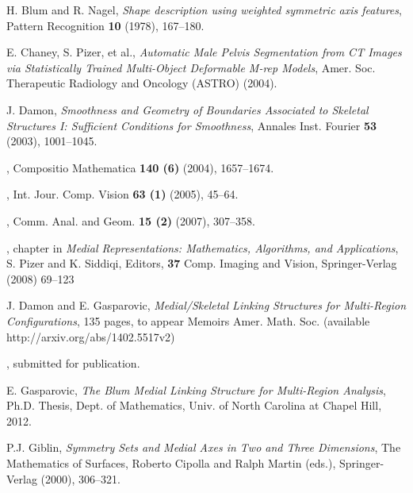 \documentclass[10pt]{amsart}
\theoremstyle{definition}
\theoremstyle{definition}
\numberwithin{equation}{section}
\begin{document}
\begin{thebibliography}{1}


  H. Blum and R. Nagel,  {\em Shape description using 
weighted symmetric axis features},  Pattern Recognition {\bf 10} (1978), 
167--180. 

 E. Chaney, S. Pizer, et al.,  {\em Automatic Male Pelvis 
Segmentation from CT Images via Statistically Trained Multi-Object 
Deformable M-rep Models}, Amer. Soc. Therapeutic Radiology and Oncology 
(ASTRO) (2004).

 J. Damon,  {\em Smoothness and Geometry of Boundaries 
Associated to Skeletal Structures I: Sufficient Conditions for 
Smoothness}, Annales Inst. Fourier {\bf 53} (2003), 1001--1045.

 , 
Compositio Mathematica  {\bf 140 (6)} (2004), 1657--1674.

 , Int. Jour. Comp. Vision  {\bf 63 (1)} (2005), 
45--64.

 , Comm. Anal. and Geom. {\bf 
15 (2)} (2007), 307--358.

 , chapter in 
{\em Medial Representations: Mathematics, Algorithms, and Applications}, 
S. Pizer and K. Siddiqi, Editors, {\bf 
37} Comp. Imaging and Vision, Springer-Verlag (2008) 69--123

 J. Damon and E. Gasparovic,  {\em Medial/Skeletal 
Linking Structures for Multi-Region Configurations}, 135 pages, to appear 
Memoirs Amer. Math. Soc. (available http://arxiv.org/abs/1402.5517v2)

 , submitted for 
publication.

  E. Gasparovic,  {\em The Blum Medial Linking Structure 
for Multi-Region Analysis}, Ph.D. Thesis, Dept. of  Mathematics, Univ. of
North Carolina at Chapel Hill, 2012.

 P.J. Giblin, {\em Symmetry Sets and Medial Axes in Two 
and Three Dimensions}, The Mathematics of Surfaces, Roberto Cipolla and 
Ralph Martin (eds.), Springer-Verlag (2000), 306--321.


\end{thebibliography}
\end{document}
